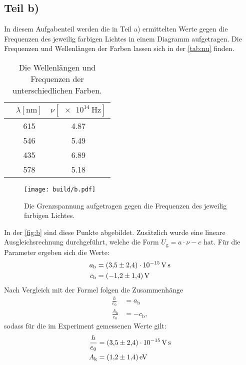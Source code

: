 \subsection{Teil b)}
In diesem Aufgabenteil werden die in Teil a) ermittelten Werte gegen die Frequenzen des jeweilig farbigen Lichtes in einem Diagramm aufgetragen. 
Die Frequenzen und Wellenlängen der Farben lassen sich in der \autoref{tab:nu} finden. 
\begin{table}
  \centering
  \caption{Die Wellenlängen und Frequenzen der unterschiedlichen Farben.}
  \label{tab:nu}
  \begin{tabular}{S[table-format=7] S[table-format=3] S[table-format=1.2]}
    \toprule
    & $\lambda [\si{\nano\metre}]$ & $\nu [\SI{e14}{\hertz}]$\\
    \midrule
        & 615 & 4.87\\
       & 546 & 5.49\\
     & 435 & 6.89\\
     & 578 & 5.18 \\
    \bottomrule
  \end{tabular}
\end{table}

\begin{figure}[H]
  \centering
  \texttt{[image: build/b.pdf]}
  \caption{Die Grenzspannung aufgetragen gegen die Frequenzen des jeweilig farbigen Lichtes.}
  \label{fig:b}
\end{figure}
\noindent
In der \autoref{fig:b} sind diese Punkte abgebildet. 
Zusätzlich wurde eine lineare Ausgleichsrechnung durchgeführt, welche die Form $U_{\text{g}} = a\cdot \nu - c$ hat.
Für die Parameter ergeben sich die Werte: 
\begin{align*}
  a_{\text{b}} &= \SI{3.5(24)e-15}{\volt\second}\\
  c_{\text{b}} &= \SI{-1.2 \pm 1.4}{\volt}
\end{align*}
Nach Vergleich mit der Formel %
folgen die Zusammenhänge
\begin{align*}
  \frac{h}{e_0} &= a_{\text{b}}\\
  \frac{A_{\text{k}}}{e_0} &= - c_{\text{b}},
\end{align*}
sodass für die im Experiment gemessenen Werte gilt:
\begin{align*}
  \frac{h}{e_0} &= \SI{3.5(24)e-15}{\volt\second}\\
  A_{\text{k}} &= \SI{1.2 \pm 1.4}{\electronvolt}
\end{align*}

